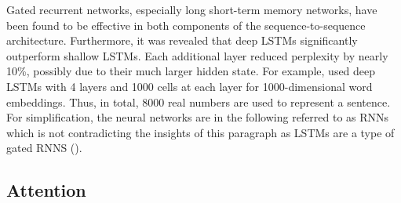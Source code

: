 \documentclass[
]{krantz}
\begin{document}
Gated recurrent networks, especially long short-term memory networks,
have been found to be effective in both components of the
sequence-to-sequence architecture. Furthermore, it was revealed that
deep LSTMs significantly outperform shallow LSTMs. Each additional layer
reduced perplexity by nearly 10\%, possibly due to their much larger
hidden state. For example, \citep{Sutskever2014} used deep LSTMs with 4
layers and 1000 cells at each layer for 1000-dimensional word
embeddings. Thus, in total, 8000 real numbers are used to represent a
sentence. For simplification, the neural networks are in the following
referred to as RNNs which is not contradicting the insights of this
paragraph as LSTMs are a type of gated RNNS (\citep{Sutskever2014}).

\hypertarget{attention}{%
\subsection{Attention}\label{attention}}
\end{document}
